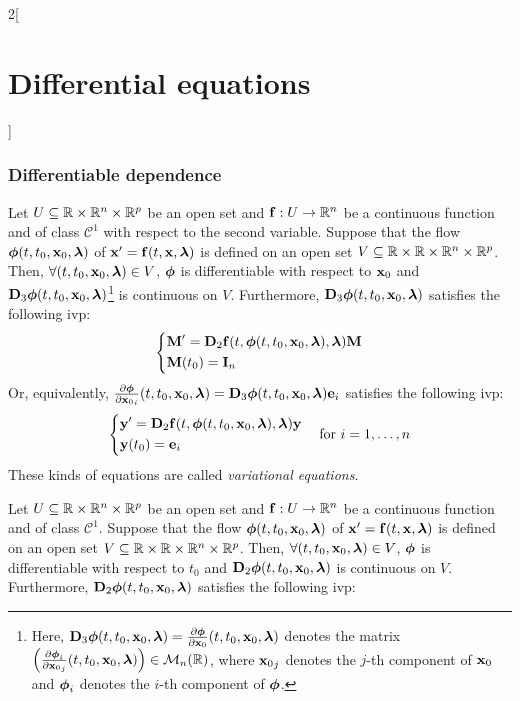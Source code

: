 \documentclass[../../../main.tex]{subfiles}
\begin{document}
\begin{multicols}{2}[\section{Differential equations}]
  \subsubsection{Differentiable dependence}
  \begin{theorem}[Dependence on $\vf{x}_0$]
    Let $U\subseteq\RR\times\RR^n\times\RR^p$ be an open set and $\vf{f}:U\rightarrow\RR^n$ be a continuous function and of class $\mathcal{C}^1$ with respect to the second variable. Suppose that the flow $\vf{\phi}(t,t_0,\vf{x}_0,\vf{\lambda})$ of $\vf{x}'=\vf{f}(t,\vf{x},\vf{\lambda})$ is defined on an open set $V\subseteq\RR\times\RR\times\RR^n\times\RR^p$. Then, $\forall (t,t_0,\vf{x}_0,\vf{\lambda})\in V$, $\vf{\phi}$ is differentiable with respect to $\vf{x}_0$ and $\vf{D}_3\vf{\phi}(t,t_0,\vf{x}_0,\vf{\lambda})$\footnote{Here, $\vf{D}_3\vf{\phi}(t,t_0,\vf{x}_0,\vf{\lambda})=\frac{\partial\vf{\phi}}{\partial \vf{x}_0}(t,t_0,\vf{x}_0,\vf{\lambda})$ denotes the matrix $\left(\frac{\partial\vf{\phi}_i}{\partial{\vf{x}_0}_j}(t,t_0,\vf{x}_0,\vf{\lambda})\right)\in\mathcal{M}_n(\RR)$, where ${\vf{x}_0}_j$ denotes the $j$-th component of $\vf{x}_0$ and $\vf{\phi}_i$ denotes the $i$-th component of $\vf{\phi}$.} is continuous on $V$. Furthermore, $\vf{D}_3\vf{\phi}(t,t_0,\vf{x}_0,\vf{\lambda})$ satisfies the following ivp:
    \begin{equation*}
      \left\{
      \begin{aligned}
         & \vf{M}'      =\vf{D}_2\vf{f}(t,\vf{\phi}(t,t_0,\vf{x}_0,\vf{\lambda}),\vf{\lambda})\vf{M} \\
         & \vf{M}(t_0)  =\vf{I}_n
      \end{aligned}
      \right.
    \end{equation*}
    Or, equivalently, $\frac{\partial\vf{\phi}}{\partial {\vf{x}_0}_i}(t,t_0,\vf{x}_0,\vf{\lambda})=\vf{D}_3\vf{\phi}(t,t_0,\vf{x}_0,\vf{\lambda})\vf{e}_i$ satisfies the following ivp:
    $$
      \left\{
      \begin{aligned}
         & \vf{y}'      =\vf{D}_2\vf{f}(t,\vf{\phi}(t,t_0,\vf{x}_0,\vf{\lambda}),\vf{\lambda})\vf{y} \\
         & \vf{y}(t_0)  =\vf{e}_i
      \end{aligned}
      \right.\quad\text{for }i=1,\ldots,n
    $$
    These kinds of equations are called \emph{variational equations}.
  \end{theorem}
  \begin{theorem}[Dependence on $t_0$]
    Let $U\subseteq\RR\times\RR^n\times\RR^p$ be an open set and $\vf{f}:U\rightarrow\RR^n$ be a continuous function and of class $\mathcal{C}^1$. Suppose that the flow $\vf{\phi}(t,t_0,\vf{x}_0,\vf{\lambda})$ of $\vf{x}'=\vf{f}(t,\vf{x},\vf{\lambda})$ is defined on an open set $V\subseteq\RR\times\RR\times\RR^n\times\RR^p$. Then, $\forall (t,t_0,\vf{x}_0,\vf{\lambda})\in V$, $\vf{\phi}$ is differentiable with respect to $t_0$ and $\vf{D}_2\vf{\phi}(t,t_0,\vf{x}_0,\vf{\lambda})$ is continuous on $V$. Furthermore, $\vf{D}_2\vf{\phi}(t,t_0,\vf{x}_0,\vf{\lambda})$ satisfies the following ivp:

\end{theorem}
\end{multicols}
\end{document}
